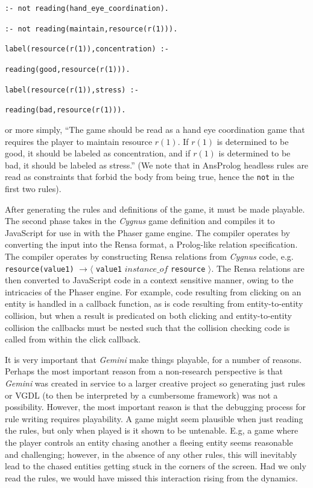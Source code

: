 \documentclass[12pt]{report}
\begin{document}
\noindent \texttt{:- not reading(hand\_eye\_coordination).}

\noindent \texttt{:- not reading(maintain,resource(r(1))).}
 
\noindent \texttt{label(resource(r(1)),concentration) :- }

\indent \texttt{reading(good,resource(r(1))).}

\noindent \texttt{label(resource(r(1)),stress) :-}

\indent \texttt{reading(bad,resource(r(1))).}


\noindent or more simply, ``The game should be read as a hand eye coordination game that requires the player to maintain resource $r(1)$.  If $r(1)$ is determined to be good, it should be labeled as concentration, and if $r(1)$ is determined to be bad, it should be labeled as stress.''  (We note that in AnsProlog headless rules are read as constraints that forbid the body from being true, hence the \texttt{not} in the first two rules).  

After generating the rules and definitions of the game, it must be made playable.  The second phase takes in the \textit{Cygnus} game definition and compiles it to JavaScript for use in with the Phaser game engine.  The compiler operates by converting the input into the Rensa \cite{harmon2017narrative}  format, a Prolog-like relation specification.  The compiler operates by constructing Rensa relations from \textit{Cygnus} code, e.g. \texttt{resource(value1)} $\rightarrow \langle $ \texttt{value1}  $instance\_of$ \texttt{resource} $\rangle$.  The Rensa relations are then converted to JavaScript code in a context sensitive manner, owing to the intricacies of the Phaser engine. For example, code resulting from clicking on an entity is handled in a callback function, as is code resulting from entity-to-entity collision, but when a result is predicated on both clicking and entity-to-entity collision the callbacks must be nested such that the collision checking code is called from within the click callback.  

It is very important that \textit{Gemini} make things playable, for a number of reasons.  Perhaps the most important reason from a non-research perspective is that \textit{Gemini} was created in service to a larger creative project so generating just rules or VGDL (to then be interpreted by a cumbersome framework) was not a possibility.  However, the most important reason is that the debugging process for rule writing requires playability.  A game might seem plausible when just reading the rules, but only when played is it shown to be untenable.  E.g, a game where the player controls an entity chasing another a fleeing entity seems reasonable and challenging; however, in the absence of any other rules, this will inevitably lead to the chased entities getting stuck in the corners of the screen.  Had we only read the rules, we would have missed this interaction rising from the dynamics.  
\end{document}
